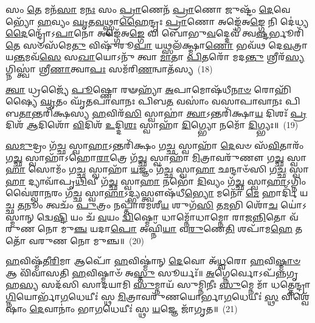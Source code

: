 𑌸𑌂 \ul{𑌤𑍇} 𑌮𑌨᳴\-\ul{𑌸𑌾} 𑌮\-\ul{𑌨𑌃} 𑌸𑌂 \ul{𑌪𑍍𑌰𑌾}\-𑌣𑍇𑌨᳴ \ul{𑌪𑍍𑌰𑌾}\-𑌣𑍋 𑌜𑍁𑌷𑍍𑌟𑌂᳴ \ul{𑌦𑍇}\-𑌵𑍇𑌭𑍍𑌯𑍋᳴ \ul{𑌹}\-𑌵𑍍𑌯𑌂 \ul{𑌘𑍃}\-𑌤\-\ul{𑌵}\-𑌥𑍍𑌸𑍍𑌵𑌾\-\ul{𑌹𑍈}\-𑌨𑍍𑌦𑍍𑌰𑌃 \ul{𑌪𑍍𑌰𑌾}\-𑌣𑍋 𑌅𑌙𑍍𑌗𑍇᳴𑌅\-\ul{𑌙𑍍𑌗𑍇} 𑌨𑌿 𑌦𑍇॑𑌧𑍍𑌯\-\ul{𑌦𑍈}\-𑌨𑍍𑌦𑍍𑌰𑍋᳴\-𑌽\-\ul{𑌪𑌾}\-𑌨𑍋 𑌅𑌙𑍍𑌗𑍇᳴𑌅\-\ul{𑌙𑍍𑌗𑍇} 𑌵𑌿 𑌬𑍋᳴𑌭𑍁\-\ul{𑌵}\-𑌦𑍍𑌦𑍇𑌵᳴ 𑌤𑍍𑌵\-\ul{𑌷𑍍𑌟}\-𑌰𑍍𑌭𑍂𑌰𑌿᳴ \ul{𑌤𑍇} 𑌸𑍞𑌸᳴𑌮𑍇\-\ul{𑌤𑍁} 𑌵𑌿𑌷𑍁᳴𑌰𑍂\-\ul{𑌪𑌾} 𑌯𑌥𑍍𑌸𑌲᳴𑌕𑍍𑌷𑍍𑌮𑌾\-\ul{𑌣𑍋} 𑌭𑌵᳴𑌥 𑌦𑍇\-\ul{𑌵}\-𑌤𑍍𑌰𑌾 𑌯\-\ul{𑌨𑍍𑌤}\-𑌮𑌵᳴\-\ul{𑌸𑍇} 𑌸\-\ul{𑌖𑌾}\-𑌯𑍋\-𑌽𑌨𑍁᳴ 𑌤𑍍𑌵𑌾 \ul{𑌮𑌾}\-𑌤𑌾 \ul{𑌪𑌿}\-𑌤𑌰𑍋᳴ 𑌮𑌦\-\ul{𑌨𑍍𑌤𑍁} 𑌶𑍍𑌰𑍀𑌰᳴\-\ul{𑌸𑍍𑌯}\-𑌗𑍍𑌨𑌿𑌸𑍍𑌤𑍍𑌵𑌾॑ 𑌶𑍍𑌰𑍀\-\ul{𑌣𑌾}\-𑌤𑍍𑌵𑌾\-\ul{𑌪𑌃} 𑌸𑌮᳴𑌰𑌿\-\ul{𑌣}\-𑌨𑍍𑌵𑌾𑌤᳴𑌸𑍍𑌯~(18)

\-\ul{𑌤𑍍𑌵𑌾} 𑌧𑍍𑌰𑌜𑍍𑌯𑍈᳴ \ul{𑌪𑍂}\-𑌷𑍍𑌣𑍋 𑌰𑍟𑌹𑍍𑌯𑌾᳴ \ul{𑌅}\-𑌪𑌾𑌮𑍋𑌷᳴𑌧𑍀\-\ul{𑌨𑌾}\-\-\ul{𑍞} 𑌰𑍋𑌹𑌿᳴𑌷𑍍𑌯𑍈 \ul{𑌘𑍃}\-𑌤𑌂 𑌘𑍃᳴𑌤𑌪𑌾𑌵𑌾𑌨𑌃 𑌪𑌿𑌬\-\ul{𑌤} 𑌵𑌸𑌾𑌂॑ 𑌵𑌸𑌾𑌪𑌾𑌵𑌾𑌨𑌃 𑌪𑌿𑌬\-\ul{𑌤𑌾}\-𑌨𑍍𑌤𑌰𑌿᳴𑌕𑍍𑌷𑌸𑍍𑌯 \ul{𑌹}\-𑌵𑌿𑌰᳴\-\ul{𑌸𑌿} 𑌸𑍍𑌵𑌾𑌹𑌾॑ \ul{𑌤𑍍𑌵𑌾}\-\-𑌽𑌨𑍍𑌤𑌰𑌿᳴𑌕𑍍𑌷𑌾\-\ul{𑌯} 𑌦𑌿𑌶𑌃᳴ \ul{𑌪𑍍𑌰}\-𑌦𑌿𑌶᳴ \ul{𑌆}\-𑌦𑌿𑌶𑍋᳴ \ul{𑌵𑌿}\-𑌦𑌿𑌶᳴ \ul{𑌉}\-𑌦𑍍𑌦𑌿\-\ul{𑌶𑌃} 𑌸𑍍𑌵𑌾𑌹𑌾᳴ \ul{𑌦𑌿}\-𑌗𑍍𑌭𑍍𑌯𑍋 𑌨𑌮𑍋᳴ \ul{𑌦𑌿}\-𑌗𑍍𑌭𑍍𑌯𑌃॥~(19)

{\anuvakamend[{𑌵𑌾𑌤᳴\-\ul{𑌸𑍍𑌯𑌾}\-𑌷𑍍𑌟𑌾𑌵𑌿𑍞᳴𑌶𑌤𑌿𑌶𑍍𑌚}]}%

\-\ul{𑌸}\-\-\ul{𑌮𑍁}\-𑌦𑍍𑌰𑌂 𑌗᳴\-\ul{𑌚𑍍𑌛} 𑌸𑍍𑌵𑌾\-\ul{𑌹𑌾}\-\-𑌽𑌨𑍍𑌤𑌰𑌿᳴𑌕𑍍𑌷𑌂 𑌗\-\ul{𑌚𑍍𑌛} 𑌸𑍍𑌵𑌾𑌹𑌾᳴ \ul{𑌦𑍇}\-𑌵𑍞 𑌸᳴\-\ul{𑌵𑌿}\-𑌤𑌾𑌰𑌂᳴ 𑌗\-\ul{𑌚𑍍𑌛} 𑌸𑍍𑌵𑌾𑌹𑌾᳴\-𑌽𑌹𑍋\-\ul{𑌰𑌾}\-𑌤𑍍𑌰𑍇 𑌗᳴\-\ul{𑌚𑍍𑌛} 𑌸𑍍𑌵𑌾𑌹𑌾᳴ \ul{𑌮𑌿}\-𑌤𑍍𑌰𑌾𑌵𑌰𑍁᳴𑌣𑍗 𑌗\-\ul{𑌚𑍍𑌛} 𑌸𑍍𑌵𑌾\-\ul{𑌹𑌾} 𑌸𑍋𑌮𑌂᳴ 𑌗\-\ul{𑌚𑍍𑌛} 𑌸𑍍𑌵𑌾𑌹𑌾᳴ \ul{𑌯}\-𑌜𑍍𑌞𑌂 𑌗᳴\-\ul{𑌚𑍍𑌛} 𑌸𑍍𑌵𑌾\-\ul{𑌹𑌾} 𑌛𑌨𑍍𑌦𑌾𑍞᳴𑌸𑌿 𑌗\-\ul{𑌚𑍍𑌛} 𑌸𑍍𑌵𑌾\-\ul{𑌹𑌾} 𑌦𑍍𑌯𑌾𑌵𑌾᳴𑌪𑍃\-\ul{𑌥𑌿}\-𑌵𑍀 𑌗᳴\-\ul{𑌚𑍍𑌛} 𑌸𑍍𑌵𑌾\-\ul{𑌹𑌾} 𑌨𑌭𑍋᳴ \ul{𑌦𑌿}\-𑌵𑍍𑌯𑌂 𑌗᳴\-\ul{𑌚𑍍𑌛} 𑌸𑍍𑌵𑌾\-\ul{𑌹𑌾}\-\-𑌽𑌗𑍍𑌨𑌿𑌂 𑌵𑍈॑𑌶𑍍𑌵𑌾\-\ul{𑌨}\-𑌰𑌂 𑌗᳴\-\ul{𑌚𑍍𑌛} 𑌸𑍍𑌵𑌾\-\ul{𑌹𑌾}\-\-𑌽𑌦𑍍𑌭𑍍𑌯𑌸𑍍𑌤𑍍𑌵𑍗𑌷᳴𑌧𑍀\-\ul{𑌭𑍍𑌯𑍋} 𑌮𑌨𑍋᳴ \ul{𑌮𑍇} 𑌹𑌾𑌰𑍍𑌦𑌿᳴ 𑌯𑌚𑍍𑌛 \ul{𑌤}\-𑌨𑍂𑌂 𑌤𑍍𑌵𑌚𑌂᳴ \ul{𑌪𑍁}\-𑌤𑍍𑌰𑌂 𑌨𑌪𑍍𑌤𑌾᳴𑌰𑌮𑌶𑍀\-\ul{𑌯} 𑌶𑍁𑌗᳴\-\ul{𑌸𑌿} 𑌤\-\ul{𑌮}\-𑌭𑌿 𑌶𑍋᳴\-\ul{𑌚} 𑌯𑍋॑\-𑌽𑌸𑍍𑌮𑌾𑌨𑍍 𑌦𑍍𑌵𑍇\-\ul{𑌷𑍍𑌟𑌿} 𑌯𑌂 𑌚᳴ \ul{𑌵}\-𑌯𑌂 \ul{𑌦𑍍𑌵𑌿}\-𑌷𑍍𑌮𑍋 𑌧𑌾𑌮𑍍𑌨𑍋᳴𑌧𑌾𑌮𑍍𑌨𑍋 𑌰𑌾𑌜\-\ul{𑌨𑍍𑌨𑌿}\-𑌤𑍋 𑌵᳴𑌰𑍁𑌣 𑌨𑍋 𑌮𑍁\-\ul{𑌞𑍍𑌚} 𑌯𑌦𑌾\-\ul{𑌪𑍋} 𑌅𑌘𑍍𑌨𑌿᳴\-\ul{𑌯𑌾} 𑌵\-\ul{𑌰𑍁}\-𑌣𑍇\-\ul{𑌤𑌿} 𑌶𑌪𑌾᳴𑌮\-\ul{𑌹𑍇} 𑌤𑌤𑍋᳴ 𑌵𑌰𑍁𑌣 𑌨𑍋 𑌮𑍁𑌞𑍍𑌚॥~(20)

{\anuvakamend[{\-\ul{𑌅}\-\-\ul{𑌸𑌿} 𑌷𑌡𑍍𑌵𑌿𑍞᳴𑌶𑌤𑌿𑌶𑍍𑌚}]}%

\-\ul{𑌹}\-𑌵𑌿𑌷𑍍𑌮᳴𑌤𑍀\-\ul{𑌰𑌿}\-𑌮𑌾 𑌆𑌪𑍋᳴ \ul{𑌹}\-𑌵𑌿𑌷𑍍𑌮𑌾॑𑌨𑍍 \ul{𑌦𑍇}\-𑌵𑍋 𑌅᳴\-\ul{𑌧𑍍𑌵}\-𑌰𑍋 \ul{𑌹}\-𑌵𑌿\-\ul{𑌷𑍍𑌮𑌾}\-\-\ul{𑍞} 𑌆 𑌵𑌿᳴𑌵𑌾𑌸𑌤𑌿 \ul{𑌹}\-𑌵𑌿𑌷𑍍𑌮𑌾𑍞᳴ 𑌅\-\ul{𑌸𑍍𑌤𑍁} 𑌸𑍂𑌰𑍍𑌯𑌃᳴॥ \ul{𑌅}\-𑌗𑍍𑌨𑍇𑌰𑍍𑌵𑍋\-𑌽𑌪᳴𑌨𑍍𑌨𑌗𑍃𑌹\-\ul{𑌸𑍍𑌯} 𑌸𑌦᳴𑌸𑌿 𑌸𑌾𑌦𑌯𑌾𑌮𑌿 \ul{𑌸𑍁}\-𑌮𑍍𑌨𑌾𑌯᳴ 𑌸𑍁𑌮𑍍𑌨𑌿𑌨𑍀𑌃 \ul{𑌸𑍁}\-𑌮𑍍𑌨𑍇 𑌮𑌾᳴ 𑌧𑌤𑍍𑌤𑍇𑌨𑍍𑌦𑍍𑌰𑌾\-\ul{𑌗𑍍𑌨𑌿}\-𑌯𑍋𑌰𑍍𑌭𑌾᳴\-\ul{𑌗}\-𑌧𑍇𑌯𑍀𑌃॑ 𑌸𑍍𑌥 \ul{𑌮𑌿}\-𑌤𑍍𑌰𑌾𑌵𑌰𑍁᳴𑌣𑌯𑍋𑌰𑍍𑌭𑌾\-\ul{𑌗}\-𑌧𑍇𑌯𑍀𑌃॑ \ul{𑌸𑍍𑌥} 𑌵𑌿𑌶𑍍𑌵𑍇᳴𑌷𑌾𑌂 \ul{𑌦𑍇}\-𑌵𑌾𑌨𑌾𑌂॑ 𑌭𑌾\-\ul{𑌗}\-𑌧𑍇𑌯𑍀𑌃॑ 𑌸𑍍𑌥 \ul{𑌯}\-𑌜𑍍𑌞𑍇 𑌜𑌾᳴𑌗𑍃𑌤॥~(21)


